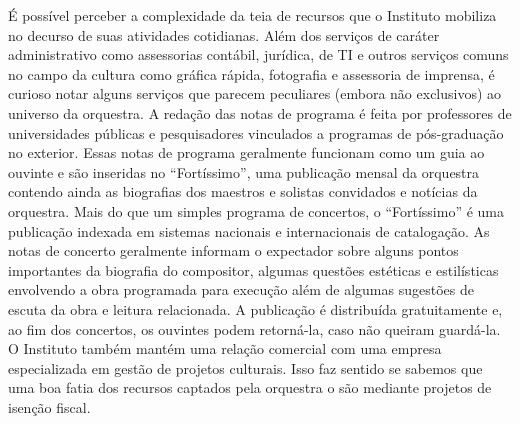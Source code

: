 \documentclass[a4paper, 12pt, openright, oneside, german, french, english, brazil]{abntex2}
\begin{document}





	É possível perceber a complexidade da teia de recursos que o Instituto mobiliza no decurso de suas atividades cotidianas. Além dos serviços de caráter administrativo como assessorias contábil, jurídica, de TI e outros serviços comuns no campo da cultura como gráfica rápida, fotografia e assessoria de imprensa, é curioso notar alguns serviços que parecem peculiares (embora não exclusivos) ao universo da orquestra. A redação das notas de programa é feita por professores de universidades públicas e pesquisadores vinculados a programas de pós-graduação no exterior. Essas notas de programa geralmente funcionam como um guia ao ouvinte e são inseridas no ``Fortíssimo'', uma publicação mensal da orquestra contendo ainda as biografias dos maestros e solistas convidados e notícias da orquestra. Mais do que um simples programa de concertos, o ``Fortíssimo'' é uma publicação indexada em sistemas nacionais e internacionais de catalogação. As notas de concerto geralmente informam o expectador sobre alguns pontos importantes da biografia do compositor, algumas questões estéticas e estilísticas envolvendo a obra programada para execução além de algumas sugestões de escuta da obra e leitura relacionada. A publicação é distribuída gratuitamente e, ao fim dos concertos, os ouvintes podem retorná-la, caso não queiram guardá-la. O Instituto também mantém uma relação comercial com uma empresa especializada em gestão de projetos culturais. Isso faz sentido se sabemos que uma boa fatia dos recursos captados pela orquestra o são mediante projetos de isenção fiscal.



	
	
\end{document}
